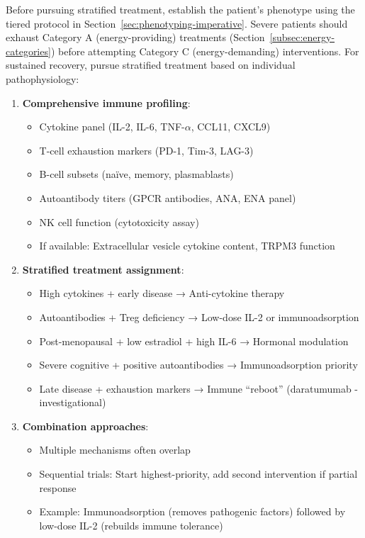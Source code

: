Before pursuing stratified treatment, establish the patient's phenotype using the tiered protocol in Section~\ref{sec:phenotyping-imperative}. Severe patients should exhaust Category A (energy-providing) treatments (Section~\ref{subsec:energy-categories}) before attempting Category C (energy-demanding) interventions. For sustained recovery, pursue stratified treatment based on individual pathophysiology:

\begin{enumerate}
    \item \textbf{Comprehensive immune profiling}:
    \begin{itemize}
        \item Cytokine panel (IL-2, IL-6, TNF-$\alpha$, CCL11, CXCL9)
        \item T-cell exhaustion markers (PD-1, Tim-3, LAG-3)
        \item B-cell subsets (naïve, memory, plasmablasts)
        \item Autoantibody titers (GPCR antibodies, ANA, ENA panel)
        \item NK cell function (cytotoxicity assay)
        \item If available: Extracellular vesicle cytokine content, TRPM3 function
    \end{itemize}

    \item \textbf{Stratified treatment assignment}:
    \begin{itemize}
        \item High cytokines + early disease → Anti-cytokine therapy
        \item Autoantibodies + Treg deficiency → Low-dose IL-2 or immunoadsorption
        \item Post-menopausal + low estradiol + high IL-6 → Hormonal modulation
        \item Severe cognitive + positive autoantibodies → Immunoadsorption priority
        \item Late disease + exhaustion markers → Immune ``reboot'' (daratumumab - investigational)
    \end{itemize}

    \item \textbf{Combination approaches}:
    \begin{itemize}
        \item Multiple mechanisms often overlap
        \item Sequential trials: Start highest-priority, add second intervention if partial response
        \item Example: Immunoadsorption (removes pathogenic factors) followed by low-dose IL-2 (rebuilds immune tolerance)
    \end{itemize}
\end{enumerate}

